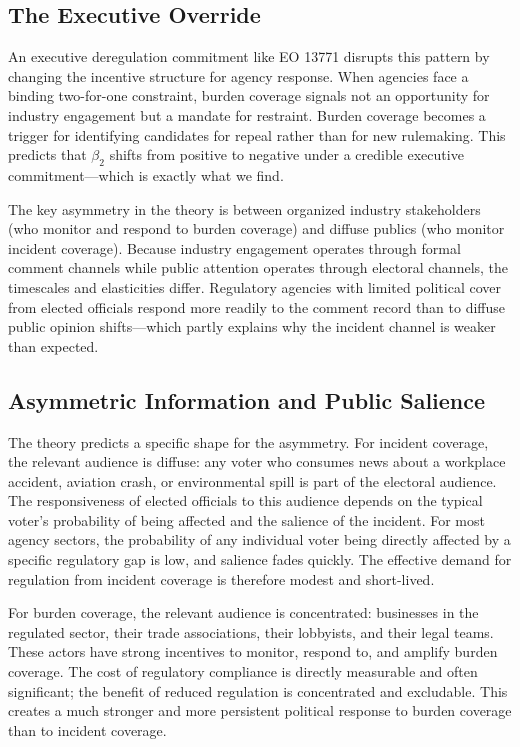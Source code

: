 \documentclass[12pt]{article}
\begin{document}
\subsection{The Executive Override}

An executive deregulation commitment like EO 13771 disrupts this pattern by changing the incentive structure for agency response. When agencies face a binding two-for-one constraint, burden coverage signals not an opportunity for industry engagement but a mandate for restraint. Burden coverage becomes a trigger for identifying candidates for repeal rather than for new rulemaking. This predicts that $\beta_2$ shifts from positive to negative under a credible executive commitment---which is exactly what we find.

The key asymmetry in the theory is between organized industry stakeholders (who monitor and respond to burden coverage) and diffuse publics (who monitor incident coverage). Because industry engagement operates through formal comment channels while public attention operates through electoral channels, the timescales and elasticities differ. Regulatory agencies with limited political cover from elected officials respond more readily to the comment record than to diffuse public opinion shifts---which partly explains why the incident channel is weaker than expected.

\subsection{Asymmetric Information and Public Salience}

The theory predicts a specific shape for the asymmetry. For incident coverage, the relevant audience is diffuse: any voter who consumes news about a workplace accident, aviation crash, or environmental spill is part of the electoral audience. The responsiveness of elected officials to this audience depends on the typical voter's probability of being affected and the salience of the incident. For most agency sectors, the probability of any individual voter being directly affected by a specific regulatory gap is low, and salience fades quickly. The effective demand for regulation from incident coverage is therefore modest and short-lived.

For burden coverage, the relevant audience is concentrated: businesses in the regulated sector, their trade associations, their lobbyists, and their legal teams. These actors have strong incentives to monitor, respond to, and amplify burden coverage. The cost of regulatory compliance is directly measurable and often significant; the benefit of reduced regulation is concentrated and excludable. This creates a much stronger and more persistent political response to burden coverage than to incident coverage.
\end{document}
